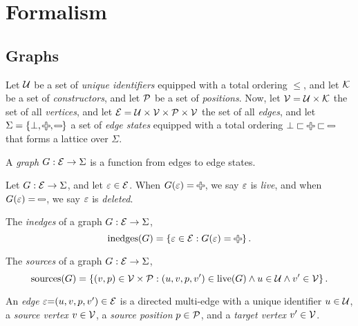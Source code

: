\section{Formalism}
\label{sec:Formalism}


\subsection{Graphs}
\label{sec:Formalism:Graphs}

Let $\U$ be a set of \emph{unique identifiers} equipped with a total ordering $\leq$,
and let $\K$ be a set of \emph{constructors},
and let $\P$ be a set of \emph{positions}.
Now, let $\V = \U \times \K$ the set of all \emph{vertices},
and let $\E = \U \times \V \times \P \times \V$ the set of all \emph{edges},
and let $\Sigma = \SetOf{\bot, \Plus, \Minus}$ a set of \emph{edge states}
equipped with a total ordering $\bot \sqsubset \Plus \sqsubset \Minus$ that forms a lattice over $\Sigma$.

\begin{definition}
  A \emph{graph} $G : \E \rightarrow \Sigma$ is a function from edges to edge states.
\end{definition}

Let $G : \E \rightarrow \Sigma$,
and let $\e \in \E$.
When $G(\e) = \Plus$, we say $\e$ is \emph{live},
and when $G(\e) = \Minus$, we say $\e$ is \emph{deleted}.

\begin{definition}
  The \emph{inedges} of a graph $G : \E \rightarrow \Sigma$,
  \[
    \inedges{G} = \SetOf{\e \in \E \SuchThat{G(\e) = \Plus}}.
  \]
\end{definition}

\begin{definition}
  The \emph{sources} of a graph $G : \E \rightarrow \Sigma$,
  \[
    \sources{G} = \SetOf{(v, p) \in \V \times \P \SuchThat{(u, v, p, v') \in \live{G} \land u \in \U \land v' \in \V}}.
  \]
\end{definition}

\begin{definition}
  An \emph{edge} $\e{=}(u, v, p, v^\prime) \in \E$ is a directed multi-edge with
  a unique identifier $u \in \U$,
  a \emph{source vertex} $v \in \V$,
  a \emph{source position} $p \in \P$,
  and a \emph{target vertex} $v' \in \V$.
\end{definition}

